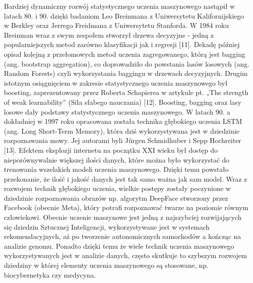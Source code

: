 \documentclass[a4paper,12pt,oneside]{book}
\begin{document}
Bardziej dynamiczny rozwój statystycznego uczenia maszynowego nastąpił w latach 80. i 90. dzięki badaniom  Leo Breinmana z Uniwersytetu Kalifornijskiego w Berkley oraz Jerrego Freidmana z Uniwersytetu Stanforda. W 1984 roku Breinman wraz z swym zespołem stworzył drzewa decyzyjne - jedną z popularniejszych metod zarówno klasyfikacji jak i regresji [11]. Dekadę później opisał kolejną z przełomowych metod uczenia zagregowanego, którą jest bagging (ang. bootstrap aggregation), co doprowadziło do powstania lasów losowych (ang. Random Forests) czyli wykorzystania baggingu w drzewach decyzyjnych. Drugim istotnym osiągnięciem w zakresie statystycznego uczenia maszynowego był boosting, zaprezentowany przez Roberta Schapierea w artykule pt.  „The strength of weak learnability” (Siła słabego nauczania) [12].  Boosting, bagging oraz lasy losowe dały podstawy statystycznego uczenia maszynowego. W latach 90. a dokładniej w 1997 roku opracowana została technika głębokiego uczenia LSTM (ang. Long Short-Term Memory), która dziś wykorzystywana jest w dziedzinie rozpoznawania mowy. Jej autorami byli Jürgen Schmidhuber  i Sepp Hochreiter [13].   Efektem eksplozji internetu na początku XXI wieku był dostęp do nieporównywalnie większej ilości danych, które można było wykorzystać do trenowania wszelakich modeli uczenia maszynowego. Dzięki temu powstało przekonanie, że ilość i jakość danych jest tak samo ważna jak sam model. Wraz z rozwojem technik głębokiego uczenia, wielkie postępy zostały poczynione w dziedzinie rozpoznawania obrazów np. algorytm DeepFace stworzony przez Facebook (obecnie Meta), który potrafi rozpoznawać twarze na poziomie równym człowiekowi. Obecnie uczenie maszynowe jest jedną z najszybciej rozwijających się dziedzin Sztucznej Inteligencji, wykorzystywane jest w systemach rekomendacyjnych, aż po tworzenie autonomicznych samochodów a kończąc na analizie genomu. Ponadto dzięki temu że wiele technik uczenia maszynowego wykorzystywanych jest w analizie danych, często skutkuje to szybszym rozwojem dziedziny w której elementy uczenia maszynowego są stosowane, np. biocybernetyka czy medycyna.
\end{document}
